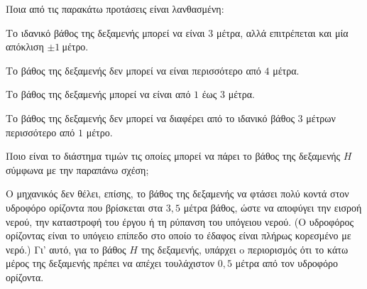 \begin{alist}
\item Ποια από τις παρακάτω προτάσεις είναι λανθασμένη:
\begin{rlist}
\item
  Το ιδανικό βάθος της δεξαμενής μπορεί να είναι $3$ μέτρα, αλλά επιτρέπεται και μία απόκλιση $\pm 1\ $μέτρο.
\item
  Το βάθος της δεξαμενής δεν μπορεί να είναι περισσότερο από $4$ μέτρα.
\item
  Το βάθος της δεξαμενής μπορεί να είναι από $1$ έως $3$ μέτρα.
\item
  Το βάθος της δεξαμενής δεν μπορεί να διαφέρει από το ιδανικό βάθος $3$ μέτρων περισσότερο από $1$ μέτρο.
\end{rlist}
\item Ποιο είναι το διάστημα τιμών τις οποίες μπορεί να πάρει το βάθος της δεξαμενής $H\ $σύμφωνα με την παραπάνω σχέση;
\item Ο μηχανικός δεν θέλει, επίσης, το βάθος της δεξαμενής να φτάσει πολύ κοντά στον υδροφόρο ορίζοντα που βρίσκεται στα $3,5$ μέτρα βάθος, ώστε να αποφύγει την εισροή νερού, την καταστροφή του έργου ή τη ρύπανση του υπόγειου νερού. (Ο υδροφόρος ορίζοντας είναι το υπόγειο επίπεδο στο οποίο το έδαφος είναι πλήρως κορεσμένο με νερό.) Γι' αυτό, για το βάθος $H$ της δεξαμενής, υπάρχει o περιορισμός ότι το κάτω μέρος της δεξαμενής πρέπει να απέχει τουλάχιστον $0,5$ μέτρα από τον υδροφόρο ορίζοντα.
\begin{center}
\end{center}
\end{alist}
